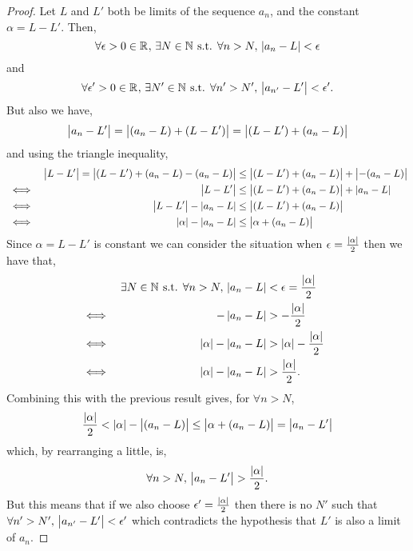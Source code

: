 \documentclass[../MathsNotesBase.tex]{subfiles}
\begin{document}
{		\bigskip	
		\begin{proof}
			Let $L$ and $L'$ both be limits of the sequence $a_n$, and the constant $\alpha = L - L'$. Then,
			\[ \forall \epsilon > 0 \in \mathbb{R}^{} ,\, \exists N \in \mathbb{N}^{} \text{ s.t. } \forall n > N ,\, \left\lvert a_{n} - L\right\rvert < \epsilon \] and
			\[ \forall \epsilon' > 0 \in \mathbb{R}^{} ,\, \exists N' \in \mathbb{N}^{} \text{ s.t. } \forall n' > N' ,\, \left\lvert a_{n'} - L'\right\rvert < \epsilon'. \]
			But also we have,
			\[ \left\lvert a_n - L'\right\rvert = \left\lvert(a_n - L) + (L - L')\right\rvert = \left\lvert(L - L') + (a_n - L)\right\rvert \]
			and using the triangle inequality,
			\begin{align*}
			&& \left\lvert L - L'\right\rvert = \left\lvert(L - L') + (a_n - L) - (a_n - L)\right\rvert &\leq \left\lvert(L - L') + (a_n - L)\right\rvert + \left\lvert-(a_n - L)\right\rvert \\
			&\iff & \left\lvert L - L'\right\rvert  &\leq \left\lvert(L - L') + (a_n - L)\right\rvert + \left\lvert a_n - L\right\rvert\\
			&\iff & \left\lvert L - L'\right\rvert - \left\lvert a_n - L\right\rvert  &\leq \left\lvert(L - L') + (a_n - L)\right\rvert\\
			&\iff & \left\lvert\alpha\right\rvert - \left\lvert a_n - L\right\rvert  &\leq \left\lvert\alpha + (a_n - L)\right\rvert\\
			\end{align*}
			Since $\alpha = L - L'$ is constant we can consider the situation when $\epsilon = \frac{\left\lvert\alpha\right\rvert}{2}$ then we have that,
			\begin{align*}
			&& \exists N \in \mathbb{N}^{} \text{ s.t. } \forall n > N ,\, \left\lvert a_{n} - L\right\rvert &< \epsilon = \frac{\left\lvert\alpha\right\rvert}{2} \\
			&\iff &  -\left\lvert a_{n} - L\right\rvert &> -\frac{\left\lvert\alpha\right\rvert}{2}  &\text{\scriptsize{}}\\
			&\iff & \left\lvert\alpha\right\rvert - \left\lvert a_{n} - L\right\rvert &> \left\lvert\alpha\right\rvert - \frac{\left\lvert\alpha\right\rvert}{2}  &\text{\scriptsize{}}\\
			&\iff & \left\lvert\alpha\right\rvert - \left\lvert a_{n} - L\right\rvert &> \frac{\left\lvert\alpha\right\rvert}{2}.  &\text{\scriptsize{}}\\
			\end{align*}
			Combining this with the previous result gives, for $\forall n > N$,
			\[ \frac{\left\lvert\alpha\right\rvert}{2} < \left\lvert\alpha\right\rvert - \left\lvert(a_n - L)\right\rvert  \leq \left\lvert\alpha + (a_n - L)\right\rvert = \left\lvert a_n - L'\right\rvert \]
			which, by rearranging a little, is,
			\[ \forall n > N,\, \left\lvert a_n - L'\right\rvert > \frac{\left\lvert\alpha\right\rvert}{2}. \]
			But this means that if we also choose $\epsilon' = \frac{\left\lvert\alpha\right\rvert}{2}$ then there is no $N'$ such that $\forall n' > N' ,\, \left\lvert a_{n'} - L'\right\rvert < \epsilon'$ which contradicts the hypothesis that $L'$ is also a limit of $a_n$.

\end{proof}}
\end{document}
